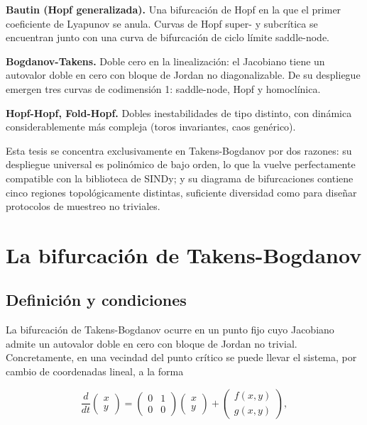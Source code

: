 \textbf{Bautin (Hopf generalizada).} Una bifurcación de Hopf en la que el primer coeficiente de Lyapunov se anula. Curvas de Hopf super- y subcrítica se encuentran junto con una curva de bifurcación de ciclo límite saddle-node.

\textbf{Bogdanov-Takens.} Doble cero en la linealización: el Jacobiano tiene un autovalor doble en cero con bloque de Jordan no diagonalizable. De su despliegue emergen tres curvas de codimensión 1: saddle-node, Hopf y homoclínica.

\textbf{Hopf-Hopf, Fold-Hopf.} Dobles inestabilidades de tipo distinto, con dinámica considerablemente más compleja (toros invariantes, caos genérico).

Esta tesis se concentra exclusivamente en Takens-Bogdanov por dos razones: su despliegue universal es polinómico de bajo orden, lo que la vuelve perfectamente compatible con la biblioteca de SINDy; y su diagrama de bifurcaciones contiene cinco regiones topológicamente distintas, suficiente diversidad como para diseñar protocolos de muestreo no triviales.

\section{La bifurcación de Takens-Bogdanov}
\label{3:sec:tb}

\subsection{Definición y condiciones}

La bifurcación de Takens-Bogdanov ocurre en un punto fijo cuyo Jacobiano admite un autovalor doble en cero con bloque de Jordan no trivial. Concretamente, en una vecindad del punto crítico se puede llevar el sistema, por cambio de coordenadas lineal, a la forma

\begin{equation}
\frac{d}{dt}
\begin{pmatrix} x \\ y \end{pmatrix}
=
\begin{pmatrix} 0 & 1 \\ 0 & 0 \end{pmatrix}
\begin{pmatrix} x \\ y \end{pmatrix}
+
\begin{pmatrix} f(x,y) \\ g(x,y) \end{pmatrix},
\tag{3.1}
\label{eq:tb_lineal}
\end{equation}

